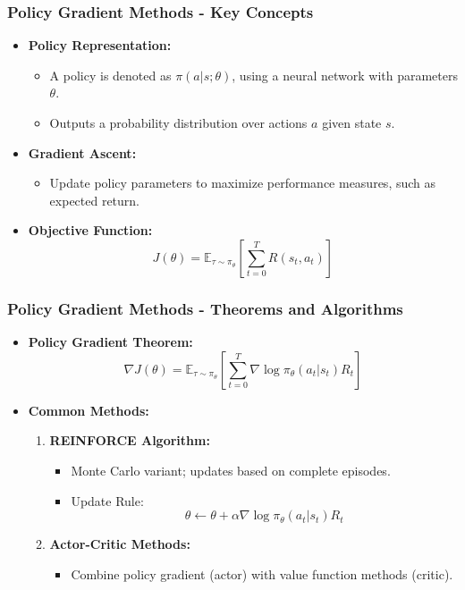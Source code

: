 \documentclass[aspectratio=169]{beamer}
\begin{document}
\begin{frame}[fragile]
    \frametitle{Policy Gradient Methods - Key Concepts}
    \begin{itemize}
        \item \textbf{Policy Representation:}
        \begin{itemize}
            \item A policy is denoted as $ \pi(a|s; \theta) $, using a neural network with parameters $ \theta $.
            \item Outputs a probability distribution over actions $ a $ given state $ s $.
        \end{itemize}
        \item \textbf{Gradient Ascent:}
        \begin{itemize}
            \item Update policy parameters to maximize performance measures, such as expected return.
        \end{itemize}
        \item \textbf{Objective Function:}
        \begin{equation}
            J(\theta) = \mathbb{E}_{\tau \sim \pi_\theta} \left[\sum_{t=0}^{T} R(s_t, a_t)\right]
        \end{equation}
    \end{itemize}
\end{frame}

\begin{frame}[fragile]
    \frametitle{Policy Gradient Methods - Theorems and Algorithms}
    \begin{itemize}
        \item \textbf{Policy Gradient Theorem:}
        \begin{equation}
            \nabla J(\theta) = \mathbb{E}_{\tau \sim \pi_\theta} \left[\sum_{t=0}^{T} \nabla \log \pi_\theta(a_t|s_t) R_t\right]
        \end{equation}
        \item \textbf{Common Methods:}
        \begin{enumerate}
            \item \textbf{REINFORCE Algorithm:} 
            \begin{itemize}
                \item Monte Carlo variant; updates based on complete episodes.
                \item Update Rule: 
                \begin{equation}
                    \theta \leftarrow \theta + \alpha \nabla \log \pi_\theta(a_t|s_t) R_t
                \end{equation}
            \end{itemize}
            \item \textbf{Actor-Critic Methods:} 
            \begin{itemize}
                \item Combine policy gradient (actor) with value function methods (critic).
            \end{itemize}
        \end{enumerate}
    \end{itemize}
\end{frame}
\end{document}

